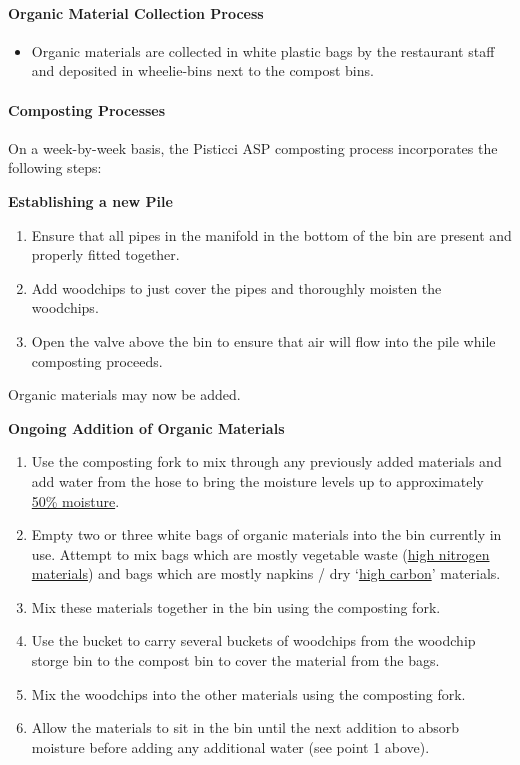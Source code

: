 \paragraph{Organic Material Collection
Process}\label{organic-material-collection-process}

\begin{itemize}
\itemsep1pt\parskip0pt
\item
  Organic materials are collected in white plastic bags by the
  restaurant staff and deposited in wheelie-bins next to the compost
  bins.
\end{itemize}

\paragraph{Composting Processes}\label{composting-processes}

On a week-by-week basis, the Pisticci ASP composting process
incorporates the following steps:

\textbf{Establishing a new Pile}

\begin{enumerate}
\def\labelenumi{\arabic{enumi}.}
\itemsep1pt\parskip0pt
\item
  Ensure that all pipes in the manifold in the bottom of the bin are
  present and properly fitted together.
\item
  Add woodchips to just cover the pipes and thoroughly moisten the
  woodchips.
\item
  Open the valve above the bin to ensure that air will flow into the
  pile while composting proceeds.
\end{enumerate}

Organic materials may now be added.

\textbf{Ongoing Addition of Organic Materials}

\begin{enumerate}
\def\labelenumi{\arabic{enumi}.}
\itemsep1pt\parskip0pt
\item
  Use the composting fork to mix through any previously added materials
  and add water from the hose to bring the moisture levels up to
  approximately \hyperref[50moisture]{50\% moisture}.
\item
  Empty two or three white bags of organic materials into the bin
  currently in use. Attempt to mix bags which are mostly vegetable waste
  (\hyperref[highnitrogen]{high nitrogen materials}) and bags which are
  mostly napkins / dry `\hyperref[highcarbon]{high carbon}' materials.
\item
  Mix these materials together in the bin using the composting fork.
\item
  Use the bucket to carry several buckets of woodchips from the woodchip
  storge bin to the compost bin to cover the material from the bags.
\item
  Mix the woodchips into the other materials using the composting fork.
\item
  Allow the materials to sit in the bin until the next addition to
  absorb moisture before adding any additional water (see point 1
  above).
\end{enumerate}

